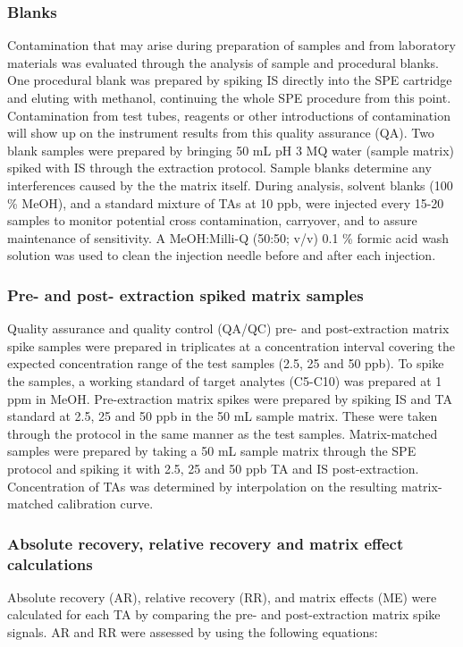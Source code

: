 
\subsubsection{Blanks}
Contamination that may arise during preparation of samples and from laboratory materials was evaluated through the analysis of sample and procedural blanks. One procedural blank was prepared by spiking IS directly into the SPE cartridge and eluting with methanol, continuing the whole SPE procedure from this point. Contamination from test tubes, reagents or other introductions of contamination will show up on the instrument results from this quality assurance (QA). Two blank samples were prepared by bringing 50 mL pH 3 MQ water (sample matrix) spiked with IS through the extraction protocol. Sample blanks determine any interferences caused by the the matrix itself. During analysis, solvent blanks (100 \% MeOH), and a standard mixture of TAs at 10 ppb, were injected every 15-20 samples to monitor potential cross contamination, carryover, and to assure maintenance of sensitivity. A MeOH:Milli-Q (50:50; v/v) 0.1 \% formic acid wash solution was used to clean the injection needle before and after each injection.

\subsubsection{Pre- and post- extraction spiked matrix samples}
Quality assurance and quality control (QA/QC) pre- and post-extraction matrix spike samples were prepared in triplicates at a concentration interval covering the expected concentration range of the test samples (2.5, 25 and 50 ppb). To spike the samples, a working standard of target analytes (C5-C10) was prepared at 1 ppm in MeOH. Pre-extraction matrix spikes were prepared by spiking IS and TA standard at 2.5, 25 and 50 ppb in the 50 mL sample matrix. These were taken through the protocol in the same manner as the test samples. Matrix-matched samples were prepared by taking a 50 mL sample matrix through the SPE protocol and spiking it with 2.5, 25 and 50 ppb TA and IS post-extraction. Concentration of TAs was determined by interpolation on the resulting matrix-matched calibration curve. 

\subsubsection{Absolute recovery, relative recovery and matrix effect calculations}
Absolute recovery (AR), relative recovery (RR), and matrix effects (ME) were calculated for each TA by comparing the pre- and post-extraction matrix spike signals. AR and RR were assessed by using the following equations:

